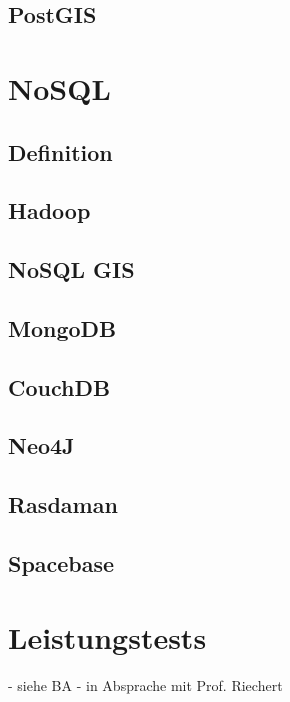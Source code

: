\subsection{PostGIS}



\section{NoSQL}

\subsection{Definition}

\subsection{Hadoop}

\subsection{NoSQL GIS}

\subsection{MongoDB}

\subsection{CouchDB}

\subsection{Neo4J}

\newpage

\subsection{Rasdaman}

\subsection{Spacebase}


\section{Leistungstests}

- siehe BA
- in Absprache mit Prof. Riechert